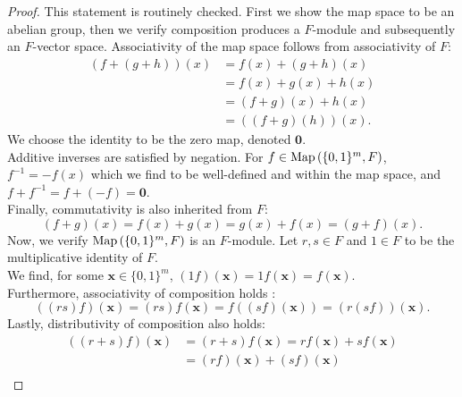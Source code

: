 \begin{proof}
	This statement is routinely checked. First we show the map space to be an abelian group, then we verify composition produces a \(F\)-module and subsequently an \(F\)-vector space.
	Associativity of the map space follows from associativity of \(F\):
	\begin{align*}
		\left( f + \left( g+h \right)  \right) \left( x \right) &= f\left( x \right) + \left( g+h \right) \left( x \right) \\
									&=  f\left( x \right) + g\left( x \right)  + h\left( x \right) \\
									&= \left( f+g \right) \left( x \right) +h\left( x \right)  \\
									&= \left( \left( f+g \right) \left( h \right)  \right) \left( x \right)
	.\end{align*}
	We choose the identity to be the zero map, denoted \(\textbf{0}\).\\
	Additive inverses are satisfied by negation. For \(f \in \operatorname{Map}\left( \{0, 1\}^{m}, F  \right) \), \(f^{-1} = -f\left( x \right) \) which we find to be well-defined and within the map space, and \(f + f^{-1} = f + \left( -f \right)  = \textbf{0}\).\\
	Finally, commutativity is also inherited from \(F\): \[
		\left( f+g \right) \left( x \right) = f\left( x \right) +g\left( x \right) = g\left( x \right) +f\left( x \right) = \left( g+f \right) \left( x \right)
	.\]
	Now, we verify \(\operatorname{Map}\left( \{0,1\} ^{m}, F \right) \) is an \(F\)-module. Let \(r, s \in F\) and \(1 \in F\) to be the multiplicative identity of \(F\).\\
	We find, for some \(\textbf{x} \in \{0, 1\} ^{m}\), \(\left( 1f \right) \left( \textbf{x} \right) = 1f\left( \textbf{x} \right) = f\left( \textbf{x} \right) \).\\
	Furthermore, associativity of composition holds :\[
		\left( \left( rs \right) f \right) \left( \textbf{x} \right) = \left( rs \right) f\left( \textbf{x} \right) = f\left( \left( sf \right) \left( \textbf{x} \right)  \right) = \left( r\left( sf \right)  \right) \left( \textbf{x} \right)
	.\]
	Lastly, distributivity of composition also holds:
	\begin{align*}
		\left( \left( r+s \right) f \right) \left( \textbf{x} \right) &= \left( r+s \right) f\left( \textbf{x} \right) = rf\left( \textbf{x} \right) + sf\left( \textbf{x} \right) \\
									      &= \left( rf \right) \left( \textbf{x} \right) + \left( sf \right) \left( \textbf{x} \right)  \\

\end{align*}
\end{proof}
